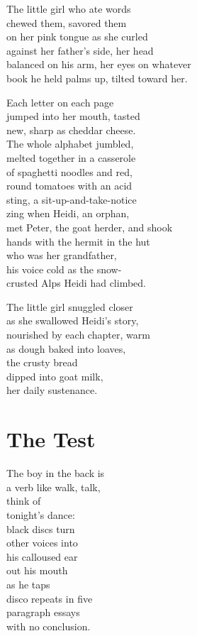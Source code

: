\documentclass[twoside,10pt]{book}
\begin{document}
The little girl who ate words\\
chewed them, savored them\\
on her pink tongue as she curled\\
against her father's side, her head\\
balanced on his arm, her eyes on whatever\\
book he held palms up, tilted toward her.

Each letter on each page\\
jumped into her mouth, tasted\\
new, sharp as cheddar cheese.\\
The whole alphabet jumbled,\\
melted together in a casserole\\
of spaghetti noodles and red,\\
round tomatoes with an acid\\
sting, a sit-up-and-take-notice\\
zing when Heidi, an orphan,\\
met Peter, the goat herder, and shook\\
hands with the hermit in the hut\\
who was her grandfather,\\
his voice cold as the snow-\\
crusted Alps Heidi had climbed.

The little girl snuggled closer\\
as she swallowed Heidi's story,\\
nourished by each chapter, warm\\
as dough baked into loaves,\\
the crusty bread\\
dipped into goat milk,\\
her daily sustenance.


\clearpage
\section{The Test}

The boy in the back is\\
a verb like walk, talk,\\
think of\\
tonight's dance:\\
black discs turn\\
other voices into\\
his calloused ear\\
out his mouth\\
as he taps\\
disco repeats in five\\
paragraph essays\\
with no conclusion.
\end{document}
